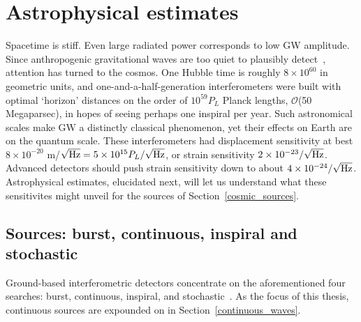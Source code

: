     \section{Astrophysical estimates}
    \label{estimates}

Spacetime is stiff.
Even large radiated power corresponds to low GW amplitude.
Since anthropogenic gravitational waves are too quiet to plausibly detect~\cite{Saulson}, attention has turned to the cosmos.
One Hubble time is roughly $8\times 10^{60}$ in geometric units, and one-and-a-half-generation interferometers were built with optimal `horizon' distances on the order of $10^{59} P_L$ Planck lengths, $\mathcal{O}$(50 Megaparsec), in hopes of seeing perhaps one inspiral per year.
Such astronomical scales make GW a distinctly classical phenomenon, yet their effects on Earth are on the quantum scale.
These interferometers had displacement sensitivity at best $8\times 10^{-20}$ m/$\sqrt{\textup{Hz}} = 5\times10^{15} P_L/\sqrt{\textup{Hz}}$, or strain sensitivity $2\times10^{-23}/\sqrt{\textup{Hz}}$.
Advanced detectors should push strain sensitivity down to about $4\times10^{-24}/\sqrt{\textup{Hz}}$.
Astrophysical estimates, elucidated next, will let us understand what these sensitivites might unveil for the sources of Section~\ref{cosmic_sources}.


        \subsection{Sources: burst, continuous, inspiral and stochastic}
        \label{source_types}


Ground-based interferometric detectors concentrate on the aforementioned four searches: burst, continuous, inspiral, and stochastic~\cite{Riles2013}.
As the focus of this thesis, continuous sources are expounded on in Section~\ref{continuous_waves}.

